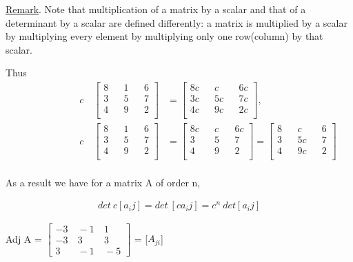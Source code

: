 \documentclass[11pt]{amsbook}
\begin{document}
\setlength{\parindent}{7ex}
\underline{Remark}. Note that multiplication of a matrix by a scalar 
and that of a determinant by a scalar are defined differently: a
matrix is multiplied by a scalar by multiplying every element by 
multiplying only one row(column) by that scalar.\par 
Thus
\begin{align*}
\qquad \qquad \qquad c  \quad       
	\begin{bmatrix}
		8  &&   1    &&  6\\
		3  &&   5    &&   7\\
		4  &&   9    &&  2\\
	\end{bmatrix} 
&= 
	\begin{bmatrix}
		8c  &&   c    &&  6c\\
		3c  &&   5c    &&   7c\\
		4c  &&   9c    &&  2c\\
	\end{bmatrix} ,
\\
\qquad \qquad \qquad c  \quad       
	\begin{bmatrix}
		8  &&   1    &&  6\\
		3  &&   5    &&   7\\
		4  &&   9    &&  2\\
	\end{bmatrix} 
&= 
	\begin{bmatrix}
		8c  &&   c    &&  6c\\
		3  &&   5    &&   7\\
		4  &&   9    &&  2\\
	\end{bmatrix}
= 
	\begin{bmatrix}
		8  &&   c    &&  6\\
		3  &&   5c    &&   7\\
		4  &&   9c    &&  2\\
	\end{bmatrix}
\end{align*}\\
As a result we have for a matrix A of order n,
   
  
\begin{align*}
 	det \ c[a_ij] = det \ [ca_ij] = c^n \ det[a_ij]
\end{align*}   

\begin{center}
Adj A = $\begin{bmatrix} 
-3 &\ -1 &\ 1 \\
-3 &\  3 &\ 3 \\
3 &\ -1 &\ -5
\end{bmatrix}$ = [$A_{ji}$]
\end{center}
\end{document}
